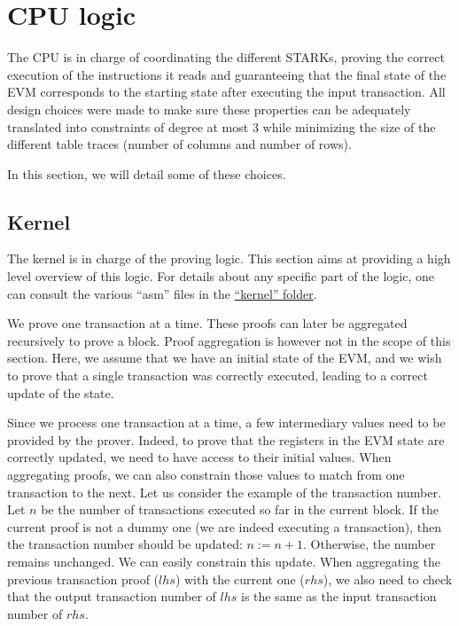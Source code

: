 \section{CPU logic}
\label{cpulogic}

The CPU is in charge of coordinating the different STARKs, proving the correct execution of the instructions it reads and guaranteeing
that the final state of the EVM corresponds to the starting state after executing the input transaction. All design choices were made 
to make sure these properties can be adequately translated into constraints of degree at most 3 while minimizing the size of the different
table traces (number of columns and number of rows).

In this section, we will detail some of these choices.

\subsection{Kernel}
The kernel is in charge of the proving logic. This section aims at providing a high level overview of this logic. For details about any specific part of the logic, one can consult the various ``asm'' files in the \href{https://github.com/0xPolygonZero/plonky2/tree/main/evm/src/cpu/kernel}{``kernel'' folder}.

We prove one transaction at a time. These proofs can later be aggregated recursively to prove a block. Proof aggregation is however not in the scope of this section. Here, we assume that we have an initial state of the EVM, and we wish to prove that a single transaction was correctly executed, leading to a correct update of the state.

Since we process one transaction at a time, a few intermediary values need to be provided by the prover. Indeed, to prove that the registers in the EVM state are correctly updated, we need to have access to their initial values. When aggregating proofs, we can also constrain those values to match from one transaction to the next. Let us consider the example of the transaction number. Let $n$ be the number of transactions executed so far in the current block. If the current proof is not a dummy one (we are indeed executing a transaction), then the transaction number should be updated: $n := n+1$. Otherwise, the number remains unchanged. We can easily constrain this update. When aggregating the previous transaction proof ($lhs$) with the current one ($rhs$), we also need to check that the output transaction number of $lhs$ is the same as the input transaction number of $rhs$. 

